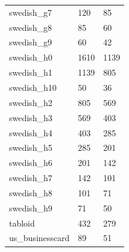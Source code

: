{\begin{supertabular}{|lll|}
                swedish\_g7 &    120 &     85 \\
                swedish\_g8 &     85 &     60 \\
                swedish\_g9 &     60 &     42 \\
                swedish\_h0 &   1610 &   1139 \\
                swedish\_h1 &   1139 &    805 \\
               swedish\_h10 &     50 &     36 \\
                swedish\_h2 &    805 &    569 \\
                swedish\_h3 &    569 &    403 \\
                swedish\_h4 &    403 &    285 \\
                swedish\_h5 &    285 &    201 \\
                swedish\_h6 &    201 &    142 \\
                swedish\_h7 &    142 &    101 \\
                swedish\_h8 &    101 &     71 \\
                swedish\_h9 &     71 &     50 \\
                    tabloid &    432 &    279 \\
           us\_businesscard &     89 &     51 \\
\end{supertabular}
}\onecolumn

